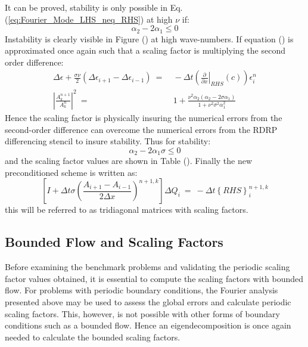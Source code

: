 \documentclass[conf]{new-aiaa}
\begin{document}
It can be proved, stability is only possible in Eq. (\ref{eq:Fourier_Mode_LHS_neq_RHS}) at high $\nu$ if:
\begin{equation*}
	\alpha_2-2\alpha_1 \leq 0
\end{equation*}
Instability is clearly visible in Figure () at high wave-numbers. If equation () is approximated once again such that a scaling factor is multiplying the second order difference:
\begin{equation}
	\begin{split}
		\label{eq:Fourier_Mode_LHS_neq_RHS_Scaling}
   			\Delta{\epsilon}+\frac{\sigma\nu}{2}\left(\Delta{\epsilon_{i+1}}-\Delta{\epsilon_{i-1}} \right)~=&~-\Delta{t}\left(\left.\frac{\partial}{\partial{x}}\right|_{RHS}\left( c \right)\right) {\epsilon}_i^{n} \\
  			\left|\frac{A_k^{n+1}}{A_k^{n}} \right|^2~=&~1+\frac{\nu^2\alpha_2\left(\alpha_2-2\sigma\alpha_1\right)}{1+\nu^2\sigma^2\alpha_1^2}
	\end{split}
\end{equation}
Hence the scaling factor is physically insuring the numerical errors from the second-order difference can overcome the numerical errors from the RDRP differencing stencil to insure stability. Thus for stability:
\begin{equation*}
	\alpha_2-2\alpha_1\sigma \leq 0
\end{equation*}
and the scaling factor values are shown in Table (). Finally the new preconditioned scheme is written as: 
\begin{equation}
	\label{eq:TriDi_NS_Scaling}
  		\left[I+\Delta{t}\sigma\left(\frac{A_{i+1}-A_{i-1}}{2\Delta{x}}\right)^{n+1,k}\right]\Delta{Q}_i~=~-\Delta{t}\left\{RHS\right\}_i^{n+1, k}
\end{equation}
this will be referred to as tridiagonal matrices with scaling factors. 
\subsection{Bounded Flow and Scaling Factors}
Before examining the benchmark problems and validating the periodic scaling factor values obtained, it is essential to compute the scaling factors with bounded flow.
For problems with periodic boundary conditions, the Fourier analysis presented above may be used to assess the global errors and calculate periodic scaling factors. 
This, however, is not possible with other forms of boundary conditions such as a bounded flow. 
Hence an eigendecomposition is once again needed to calculate the bounded scaling factors. 
\end{document}
